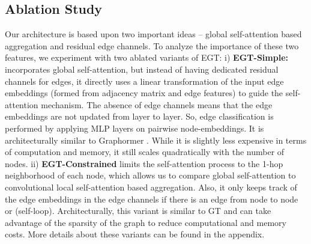 \documentclass[sigconf,authorversion]{acmart}
\begin{document}
\subsection{Ablation Study}
Our architecture is based upon two important ideas -- global self-attention based aggregation and residual edge channels. To analyze the importance of these two features, we experiment with two ablated variants of EGT: i) {\bf EGT-Simple:} incorporates global self-attention, but instead of having dedicated residual channels for edges, it directly uses a linear transformation of the input edge embeddings  (formed from adjacency matrix and edge features) to guide the self-attention mechanism. The absence of edge channels means that the edge embeddings  are not updated from layer to layer. So, edge classification is performed by applying MLP layers on pairwise node-embeddings. It is architecturally similar to Graphormer \citep{ying2021transformers}. While it is slightly less expensive in terms of computation and memory, it still scales quadratically with the number of nodes. ii) {\bf EGT-Constrained} limits the self-attention process to the 1-hop neighborhood of each node, which allows us to compare global self-attention to convolutional local self-attention based aggregation.  Also, it only keeps track of the edge embeddings  in the edge channels if there is an edge from node  to node  or  (self-loop). Architecturally, this variant is similar to GT \citep{dwivedi2020generalization} and can take advantage of the sparsity of the graph to reduce computational and memory costs. More details about these variants can be found in the appendix.
\end{document}
